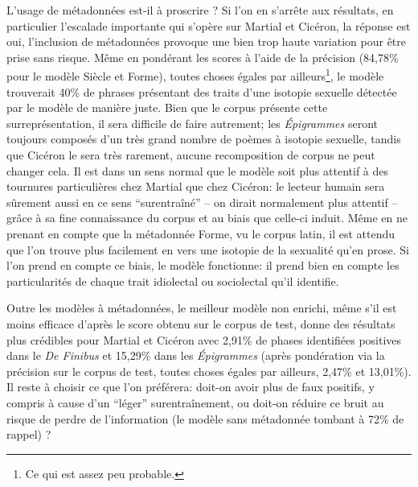 L'usage de métadonnées est-il à proscrire ? Si l'on en s'arrête aux résultats, en particulier l'escalade importante qui s'opère sur Martial et Cicéron, la réponse est oui, l'inclusion de métadonnées provoque une bien trop haute variation pour être prise sans risque. Même en pondérant les scores à l'aide de la précision (84,78\% pour le modèle Siècle et Forme), toutes choses égales par ailleurs\footnote{Ce qui est assez peu probable.}, le modèle trouverait 40\% de phrases présentant des traits d'une isotopie sexuelle détectée par le modèle de manière juste. Bien que le corpus présente cette surreprésentation, il sera difficile de faire autrement; les \textit{Épigrammes} seront toujours composés d'un très grand nombre de poèmes à isotopie sexuelle, tandis que Cicéron le sera très rarement, aucune recomposition de corpus ne peut changer cela. Il est dans un sens normal que le modèle soit plus attentif à des tournures particulières chez Martial que chez Cicéron: le lecteur humain sera sûrement aussi en ce sens \enquote{surentraîné} -- on dirait normalement plus attentif -- grâce à sa fine connaissance du corpus et au biais que celle-ci induit. Même en ne prenant en compte que la métadonnée Forme, vu le corpus latin, il est attendu que l'on trouve plus facilement en vers une isotopie de la sexualité qu'en prose. Si l'on prend en compte ce biais, le modèle fonctionne: il prend bien en compte les particularités de chaque trait idiolectal ou sociolectal qu'il identifie.

Outre les modèles à métadonnées, le meilleur modèle non enrichi, même s'il est moins efficace d'après le score obtenu sur le corpus de test, donne des résultats plus crédibles pour Martial et Cicéron avec 2,91\% de phases identifiées positives dans le \textit{De Finibus} et 15,29\% dans les \textit{Épigrammes} (après pondération via la précision sur le corpus de test, toutes choses égales par ailleurs, 2,47\% et 13,01\%). Il reste à choisir ce que l'on préférera: doit-on avoir plus de faux positifs, y compris à cause d'un \enquote{léger} surentraînement, ou doit-on réduire ce bruit au risque de perdre de l'information (le modèle sans métadonnée tombant à 72\% de rappel) ? 


